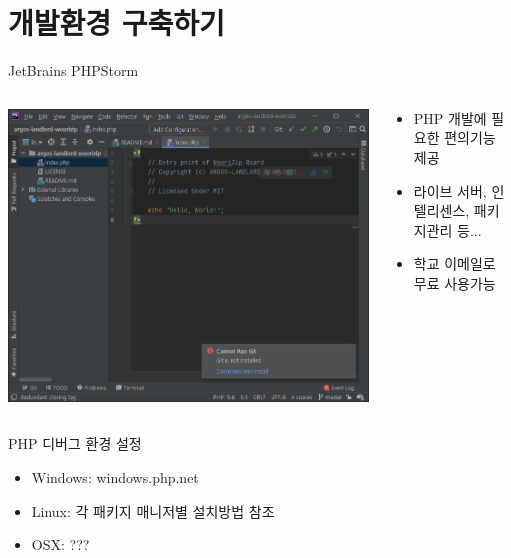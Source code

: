 \documentclass{beamer}
\begin{document}
\section{개발환경 구축하기}
    \begin{frame}{JetBrains PHPStorm}
        \begin{columns}
            \begin{column}{0.4\textwidth}
                \includegraphics[width=\textwidth]{Images/jetbrains-0.png}
            \end{column}
            \begin{column}{0.6\textwidth}
                \begin{itemize}
                    \item PHP 개발에 필요한 편의기능 제공
                    \item 라이브 서버, 인텔리센스, 패키지관리 등...
                    \item 학교 이메일로 무료 사용가능
                \end{itemize}
            \end{column}
        \end{columns}
    \end{frame}

    \begin{frame}{PHP 디버그 환경 설정}
        \begin{itemize}
            \item Windows: windows.php.net
            \item Linux: 각 패키지 매니저별 설치방법 참조
            \item OSX: ???
        \end{itemize}
    \end{frame}
\end{document}
